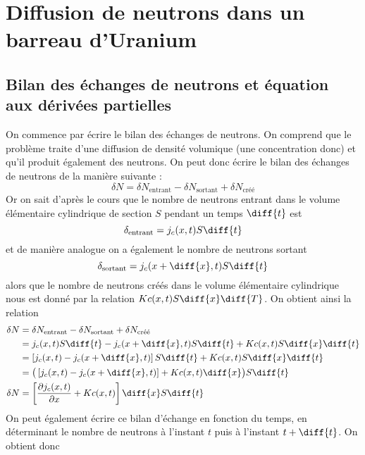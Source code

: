 \documentclass[a4paper,12pt]{article}
\begin{document}
\section{Diffusion de neutrons dans un barreau d'Uranium}

\subsection{Bilan des échanges de neutrons et équation aux dérivées partielles}

On commence par écrire le bilan des échanges de neutrons. On comprend que le problème traite d'une diffusion de densité volumique (une concentration donc) et qu'il produit également des neutrons. On peut donc écrire le bilan des échanges de neutrons de la manière suivante :
\begin{equation}
	\delta {N} = \delta N_\text{entrant} - \delta N_\text{sortant} + \delta N_\text{créé}
\end{equation}
Or on sait d'après le cours que le nombre de neutrons entrant dans le volume élémentaire cylindrique de section $S$ pendant un temps $\diff{t}$ est
\begin{equation}
	\delta_\text{entrant} = j_c (x,t) S \diff{t}
\end{equation}
et de manière analogue on a également le nombre de neutrons sortant
\begin{equation}
	\delta_\text{sortant} = j_c (x+\diff{x}, t) S \diff{t}
\end{equation}
alors que le nombre de neutrons créés dans le volume élémentaire cylindrique nous est donné par la relation $Kc(x,t)S\diff{x}\diff{T}$. On obtient ainsi la relation
\begin{equation}
	\begin{split}
		\delta N	&= \delta N_\text{entrant} - \delta N_\text{sortant} + \delta N_\text{créé}\\
					&= j_c (x,t) S \diff{t} - j_c (x+\diff{x}, t) S \diff{t} + Kc(x,t)S\diff{x}\diff{t}\\
					&= \left[ j_c (x,t) - j_c (x+\diff{x},t) \right] S \diff{t} + Kc(x,t) S \diff{x}\diff{t}\\
					&= \big( \left[ j_c (x,t) - j_c (x+\diff{x},t) \right] + Kc(x,t)\diff{x}\big)S\diff{t}\\
		\delta N	&= \left[ \frac{\partial j_c (x,t)}{\partial x} + Kc(x,t) \right] \diff{x} S \diff{t}
	\end{split}
\end{equation}
On peut également écrire ce bilan d'échange en fonction du temps, en déterminant le nombre de neutrons à l'instant $t$ puis à l'instant $t+\diff{t}$. On obtient donc
\end{document}
